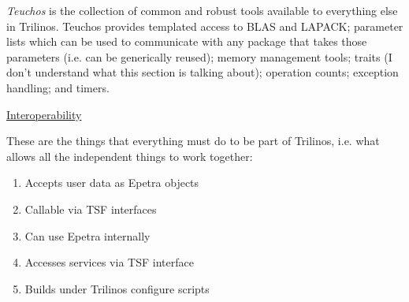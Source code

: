 \documentclass[12pt,twoside]{article}
\begin{document}
\textit{Teuchos} is the collection of common and robust tools available to everything else in Trilinos. Teuchos provides templated access to BLAS and LAPACK; parameter lists which can be used to communicate with any package that takes those parameters (i.e. can be generically reused); memory management tools; traits (I don't understand what this section is talking about); operation counts; exception handling; and timers. 

\begin{flushleft}
\underline{Interoperability}
\end{flushleft}
These are the things that everything must do to be part of Trilinos, i.e. what allows all the independent things to work together: 
\begin{enumerate}
\item Accepts user data as Epetra objects
\item Callable via TSF interfaces
\item Can use Epetra internally
\item Accesses services via TSF interface
\item Builds under Trilinos configure scripts
\end{enumerate}
\end{document}
